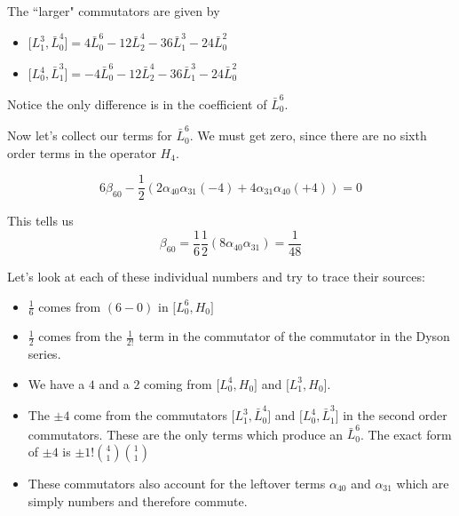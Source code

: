 \documentclass{article}
\newcommand{\lrbrack}[2]{\lbrack #1 , #2 \rbrack}
\begin{document}
The ``larger" commutators are given by
\begin{itemize}
\item $\lrbrack{L_1^3}{\bar{L}_0^4} = 4 \bar{L}_0^6 -12\bar{L}_2^4 - 36 \bar{L}_1^3 - 24 \bar{L}_0^2$\\
\item $\lrbrack{L_0^4}{\bar{L}_1^3} =-4 \bar{L}_0^6 -12\bar{L}_2^4 - 36 \bar{L}_1^3 - 24 \bar{L}_0^2$\\
\end{itemize}


Notice the only difference is in the coefficient of $\bar{L}_0^6$.


Now let's collect our terms for $\bar{L}_0^6$.  We must get zero, since there are no sixth order terms in the operator $H_4$.

\begin{equation}
6\beta_{60} - \frac{1}{2}(2\alpha_{40}\alpha_{31}(-4) + 4\alpha_{31}\alpha_{40}(+4)) = 0
\end{equation}

This tells us
\begin{equation}
\beta_{60} = \frac{1}{6}\frac{1}{2}(8\alpha_{40}\alpha_{31}) = \frac{1}{48}
\end{equation}

Let's look at each of these individual numbers and try to trace their sources:

\begin{itemize}
\item $\frac{1}{6}$ comes from $(6-0)$ in $\lrbrack{L_0^6}{H_0}$\\
\item $\frac{1}{2}$ comes from the $\frac{1}{2!}$ term in the commutator of the commutator in the Dyson series.\\
\item We have a $4$ and a $2$ coming from $\lrbrack{L_0^4}{H_0}$ and $\lrbrack{L_1^3}{H_0}$.\\
\item The $\pm 4$ come from the commutators $\lrbrack{L_1^3}{\bar{L}_0^4}$ and $\lrbrack{L_0^4}{\bar{L}_1^3}$ in the second order commutators.  These are the only terms which produce an $\bar{L}_0^6$.  The exact form of $\pm 4$ is $\pm 1! {4 \choose 1}{1 \choose 1}$\\
\item These commutators also account for the leftover terms $\alpha_{40}$ and $\alpha_{31}$ which are simply numbers and therefore commute. 
\end{itemize}
\end{document}

